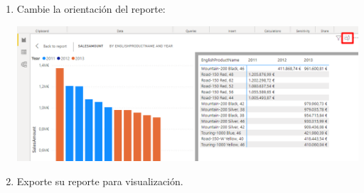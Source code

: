 \documentclass[12pt,letterpaper]{article}
\newcommand\tab[1][1cm]{\hspace*{#1}}
\begin{document}
\begin{enumerate}[\tab 1.]
\begin{itemize}
\begin{center}
            \end{center}
        \end{itemize}
        \item Cambie la orientación del reporte:
        \begin{center}
            \includegraphics[width=13cm]{./img/img17.png}
        \end{center}
        \item Exporte su reporte para visualización.
    \end{enumerate}
    
    \newpage
\end{document}
